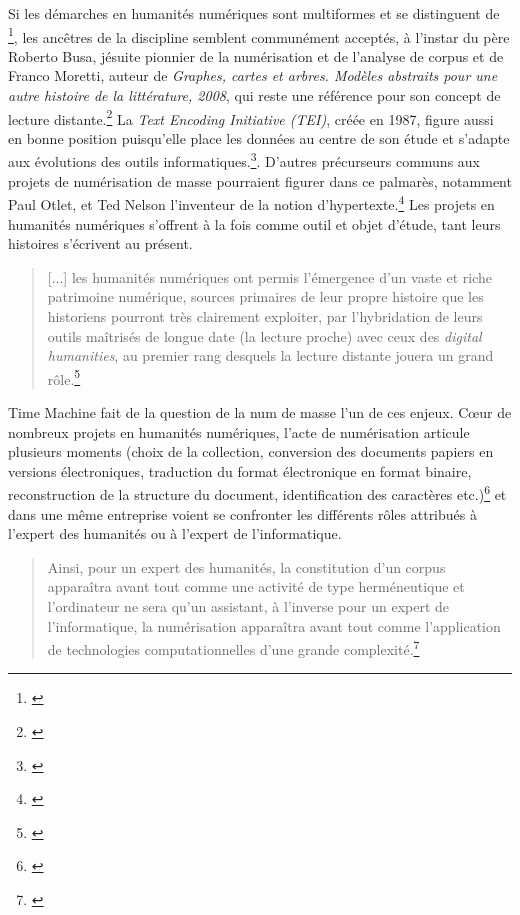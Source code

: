 Si les démarches en humanités numériques sont multiformes et se distinguent de \footnote{\cite{mounier_lou_nodate}}, les ancêtres de la discipline semblent communément acceptés, à l'instar du père Roberto Busa, jésuite pionnier de la numérisation et de l'analyse de corpus et de Franco Moretti, auteur de \textit{Graphes, cartes et arbres. Modèles abstraits pour une autre histoire de la littérature, 2008}, qui reste une référence pour son concept de lecture distante.\footnote{\cite{gefen_humanites_2017}} La \textit{Text Encoding Initiative (TEI)}, créée en 1987, figure aussi en bonne position puisqu'elle place les données au centre de son étude et s'adapte aux évolutions des outils informatiques.\footnote{\cite{clavert_les_2019}}. D'autres précurseurs communs aux projets de numérisation de masse pourraient figurer dans ce palmarès, notamment Paul Otlet, et Ted Nelson l'inventeur de la notion d'hypertexte.\footnote{\cite{clavert_les_2019}} Les projets en humanités numériques s'offrent à la fois comme outil et objet d'étude, tant leurs histoires s'écrivent au présent. 

\begin{quotation} [...] les humanités numériques ont permis l'émergence d’un vaste et riche patrimoine numérique, sources primaires de leur propre histoire que les historiens pourront très clairement exploiter, par l’hybridation de leurs outils maîtrisés de longue date (la lecture proche) avec ceux des \textit{digital humanities}, au premier rang desquels la lecture distante jouera un grand rôle.\footnote{\cite[p.43]{clavert_les_2019}}\end{quotation}

Time Machine fait de la question de la \gls{num} de masse l'un de ces enjeux. C\oe{}ur de nombreux projets en humanités numériques, l'acte de numérisation articule plusieurs moments (choix de la collection, conversion des documents papiers en versions électroniques, traduction du format électronique en format binaire, reconstruction de la structure du document, identification des caractères etc.)\footnote{\cite{meunier_paradoxe_2019}} et dans une même entreprise voient se confronter les différents rôles attribués à l'expert des humanités ou à l'expert de l'informatique. 

\begin{quotation}Ainsi, pour un expert des humanités, la constitution d’un corpus apparaîtra avant tout comme une activité de type herméneutique et l’ordinateur ne sera qu’un assistant, à l’inverse pour un expert de l’informatique, la numérisation apparaîtra avant tout comme l’application de technologies computationnelles d’une grande complexité.\footnote{\cite[p. 29]{meunier_paradoxe_2019}}\end{quotation}

